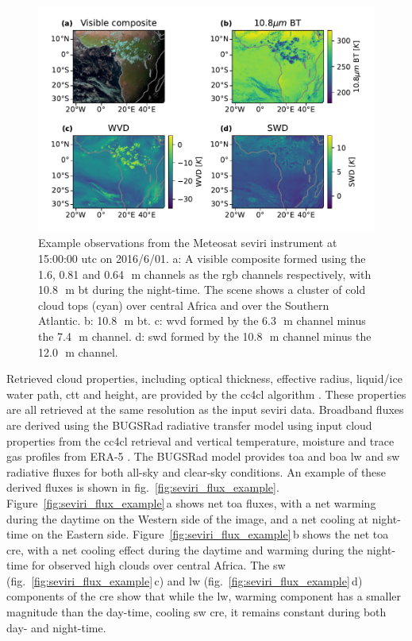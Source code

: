 \documentclass[acp, manuscript]{copernicus}
\begin{document}
\begin{figure}[tp]
    \includegraphics[width=12cm]{figures/fig01.pdf}
    \caption[
    Example observations from the Meteosat \acrshort{seviri} instrument at 15:00:00 \acrshort{utc} on 2016/6/01
    ]{
    Example observations from the Meteosat \acrshort{seviri} instrument at 15:00:00 \acrshort{utc} on 2016/6/01. a: A visible composite formed using the 1.6, 0.81 and 0.64\,\unit{\mu m} channels as the \acrshort{rgb} channels respectively, with 10.8\,\unit{\mu m} \acrshort{bt} during the night-time. The scene shows a cluster of cold cloud tops (cyan) over central Africa and over the Southern Atlantic. b: 10.8\,\unit{\mu m} \acrshort{bt}. c: \acrshort{wvd} formed by the 6.3\,\unit{\mu m} channel minus the 7.4\,\unit{\mu m} channel. d: \acrshort{swd} formed by the 10.8\,\unit{\mu m} channel minus the 12.0\,\unit{\mu m} channel.
    }
    \label{fig:seviri_obs_example}
\end{figure}


Retrieved cloud properties, including optical thickness, effective radius, liquid/ice water path, \acrshort{ctt} and height, are provided by the \acrfull{cc4cl} algorithm \citep{sus_community_2018, mcgarragh_community_2018}. 
These properties are all retrieved at the same resolution as the input \acrshort{seviri} data. Broadband fluxes are derived using the BUGSRad radiative transfer model \citep{stephens_parameterization_2001} using input cloud properties from the \acrshort{cc4cl} retrieval and vertical temperature, moisture and trace gas profiles from ERA-5 \citep{hersbach_era5_2020}. 
The BUGSRad model provides \acrshort{toa} and \acrlong{boa} \acrshort{lw} and \acrshort{sw} radiative fluxes for both all-sky and clear-sky conditions. An example of these derived fluxes is shown in fig.~\ref{fig:seviri_flux_example}. 
Figure~\ref{fig:seviri_flux_example}\,a shows net \acrshort{toa} fluxes, with a net warming during the daytime on the Western side of the image, and a net cooling at night-time on the Eastern side. 
Figure~\ref{fig:seviri_flux_example}\,b shows the net \acrshort{toa} \acrshort{cre}, with a net cooling effect during the daytime and warming during the night-time for observed high clouds over central Africa. The \acrshort{sw} (fig.~\ref{fig:seviri_flux_example}\,c) and \acrshort{lw} (fig.~\ref{fig:seviri_flux_example}\,d) components of the \acrshort{cre} show that while the \acrshort{lw},
warming component has a smaller magnitude than the day-time, cooling \acrshort{sw} \acrshort{cre}, it remains constant during both day- and night-time.
\end{document}
